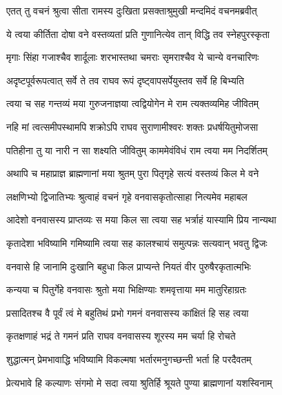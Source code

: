 
\twolineshloka
{एतत् तु वचनं श्रुत्वा सीता रामस्य दुःखिता}
{प्रसक्ताश्रुमुखी मन्दमिदं वचनमब्रवीत्} %

\twolineshloka
{ये त्वया कीर्तिता दोषा वने वस्तव्यतां प्रति}
{गुणानित्येव तान् विद्धि तव स्नेहपुरस्कृता} %

\twolineshloka
{मृगाः सिंहा गजाश्चैव शार्दूलाः शरभास्तथा}
{चमराः सृमराश्चैव ये चान्ये वनचारिणः} %

\twolineshloka
{अदृष्टपूर्वरूपत्वात् सर्वे ते तव राघव}
{रूपं दृष्ट्वापसर्पेयुस्तव सर्वे हि बिभ्यति} %

\twolineshloka
{त्वया च सह गन्तव्यं मया गुरुजनाज्ञया}
{त्वद्वियोगेन मे राम त्यक्तव्यमिह जीवितम्} %

\twolineshloka
{नहि मां त्वत्समीपस्थामपि शक्रोऽपि राघव}
{सुराणामीश्वरः शक्तः प्रधर्षयितुमोजसा} %

\twolineshloka
{पतिहीना तु या नारी न सा शक्ष्यति जीवितुम्}
{काममेवंविधं राम त्वया मम निदर्शितम्} %

\twolineshloka
{अथापि च महाप्राज्ञ ब्राह्मणानां मया श्रुतम्}
{पुरा पितृगृहे सत्यं वस्तव्यं किल मे वने} %

\twolineshloka
{लक्षणिभ्यो द्विजातिभ्यः श्रुत्वाहं वचनं गृहे}
{वनवासकृतोत्साहा नित्यमेव महाबल} %

\twolineshloka
{आदेशो वनवासस्य प्राप्तव्यः स मया किल}
{सा त्वया सह भर्त्राहं यास्यामि प्रिय नान्यथा} %

\twolineshloka
{कृतादेशा भविष्यामि गमिष्यामि त्वया सह}
{कालश्चायं समुत्पन्नः सत्यवान् भवतु द्विजः} %

\twolineshloka
{वनवासे हि जानामि दुःखानि बहुधा किल}
{प्राप्यन्ते नियतं वीर पुरुषैरकृतात्मभिः} %

\twolineshloka
{कन्यया च पितुर्गेहे वनवासः श्रुतो मया}
{भिक्षिण्याः शमवृत्ताया मम मातुरिहाग्रतः} %

\twolineshloka
{प्रसादितश्च वै पूर्वं त्वं मे बहुतिथं प्रभो}
{गमनं वनवासस्य कांक्षितं हि सह त्वया} %

\twolineshloka
{कृतक्षणाहं भद्रं ते गमनं प्रति राघव}
{वनवासस्य शूरस्य मम चर्या हि रोचते} %

\twolineshloka
{शुद्धात्मन् प्रेमभावाद्धि भविष्यामि विकल्मषा}
{भर्तारमनुगच्छन्ती भर्ता हि परदैवतम्} %

\twolineshloka
{प्रेत्यभावे हि कल्याणः संगमो मे सदा त्वया}
{श्रुतिर्हि श्रूयते पुण्या ब्राह्मणानां यशस्विनाम्} %

